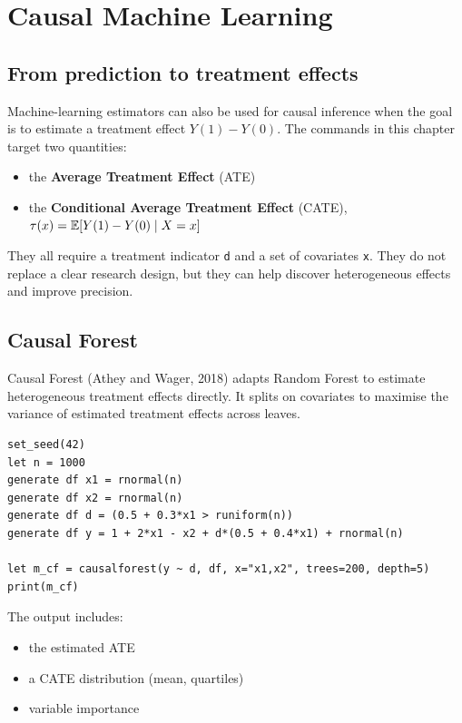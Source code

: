 \chapter{Causal Machine Learning}

\section{From prediction to treatment effects}

Machine-learning estimators can also be used for causal inference when
the goal is to estimate a treatment effect $Y(1) - Y(0)$. The commands in
this chapter target two quantities:

\begin{itemize}
\item the \textbf{Average Treatment Effect} (ATE)
\item the \textbf{Conditional Average Treatment Effect} (CATE),
      $\tau(x) = \mathbb{E}[Y(1) - Y(0) \mid X = x]$
\end{itemize}

They all require a treatment indicator \texttt{d} and a set of covariates \texttt{x}.
They do not replace a clear research design, but they can help discover
heterogeneous effects and improve precision.

\section{Causal Forest}

Causal Forest (Athey and Wager, 2018) adapts Random Forest to estimate
heterogeneous treatment effects directly. It splits on covariates to
maximise the variance of estimated treatment effects across leaves.

\begin{lstlisting}[caption={Causal Forest}]
set_seed(42)
let n = 1000
generate df x1 = rnormal(n)
generate df x2 = rnormal(n)
generate df d = (0.5 + 0.3*x1 > runiform(n))
generate df y = 1 + 2*x1 - x2 + d*(0.5 + 0.4*x1) + rnormal(n)

let m_cf = causalforest(y ~ d, df, x="x1,x2", trees=200, depth=5)
print(m_cf)
\end{lstlisting}

The output includes:

\begin{itemize}
\item the estimated ATE
\item a CATE distribution (mean, quartiles)
\item variable importance
\end{itemize}

